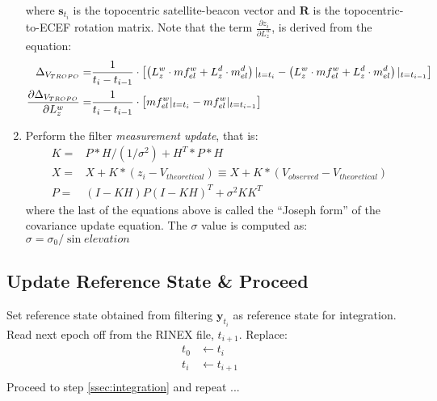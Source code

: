 \begin{enumerate}
        where $\bm{s}_{t_i}$ is the topocentric satellite-beacon vector and 
        $\bm{R}$ is the topocentric-to-ECEF rotation matrix. Note that the 
        term $\frac{\partial z_i}{\partial L^w_z}$, is derived from the 
        equation: 
        \begin{equation}
          \begin{aligned}
            \Delta _{V_{TROPO}} = &
              \frac{1}{t_i - t_{i-1}} \cdot \left[
              \left( L^w_z \cdot mf^w_{el} + L^d_z \cdot m^d_{el} \right) |_{t=t_i} 
            - \left( L^w_z \cdot mf^w_{el} + L^d_z \cdot m^d_{el} \right) |_{t=t_{i-1}}
              \right] \\
            \frac{\partial \Delta _{V_{TROPO}}}{\partial L^w_z} = &
              \frac{1}{t_i - t_{i-1}} \cdot \left[ mf^w_{el}|_{t=t_i} - mf^w_{el}|_{t=t_{i-1}} \right]
          \end{aligned}
        \end{equation}
    
    \item Perform the filter \emph{measurement update}, that is:
        \begin{equation}
            \begin{aligned}
                K = & P * H / (1/\sigma ^2) + H^T * P * H \\
                X = & X + K * (z_i - V_{theoretical}) \equiv X + K * (V_{observed} - V_{theoretical}) \\
                P = & (I - K H) P (I-K H)^T + \sigma ^2 K K^T
            \end{aligned}
        \end{equation}
        where the last of the equations above is called the ``Joseph form'' 
        of the covariance update equation. The $\sigma$ value is computed as:
        $\sigma = \sigma _0 / \sin{elevation}$
\end{enumerate}

\subsection{Update Reference State \& Proceed} \label{ssec:proceed}
Set reference state obtained from filtering $\bm{y}_{t_i}$ as reference state 
for integration. Read next epoch off from the RINEX file, $t_{i+1}$. Replace:
\begin{equation}
    \begin{aligned}
        t_0 & \leftarrow t_i \\
        t_i & \leftarrow t_{i+1} \\
    \end{aligned}
\end{equation}
Proceed to step \ref{ssec:integration} and repeat ...

